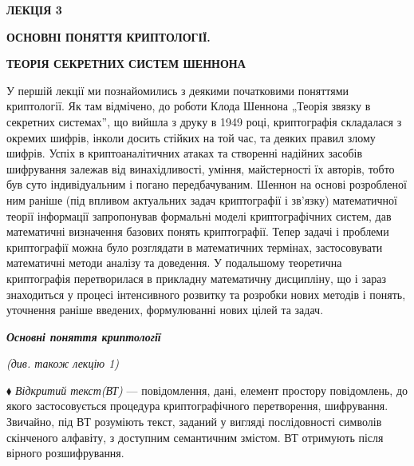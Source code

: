 \bigskip


\bigskip


\bigskip

{\bfseries
ЛЕКЦІЯ  3}


\bigskip

{\centering\bfseries
ОСНОВНІ ПОНЯТТЯ КРИПТОЛОГІЇ.
\par}

{\centering\bfseries
ТЕОРІЯ СЕКРЕТНИХ СИСТЕМ ШЕННОНА
\par}


\bigskip


\bigskip

У першій лекції ми познайомились з деякими початковими поняттями криптології. Як
там відмічено, до роботи Клода Шеннона „Теорія зв{\textquotesingle}язку в
секретних системах”, що вийшла з друку в 1949 році, криптографія складалася з 
окремих шифрів, інколи досить стійких на той час, та деяких правил злому
шифрів. Успіх в криптоаналітичних атаках та створенні надійних засобів
шифрування  залежав від винахідливості, уміння, майстерності їх авторів, тобто
був суто індивідуальним і погано передбачуваним. Шеннон на основі розробленої
ним раніше (під впливом актуальних задач криптографії і зв’язку) математичної
теорії інформації запропонував формальні моделі криптографічних систем, дав
математичні визначення базових понять криптографії. Тепер задачі і проблеми
криптографії можна було розглядати в математичних термінах, застосовувати
математичні методи аналізу та доведення. У подальшому теоретична криптографія 
перетворилася в прикладну математичну дисципліну, що і зараз знаходиться  у
процесі інтенсивного розвитку та розробки нових методів і понять, уточнення
раніше введених, формулюванні нових цілей та задач. 


\bigskip


\bigskip

{\centering\bfseries\itshape
Основні поняття криптології
\par}

{\centering\itshape
(див. також лекцію 1)
\par}


\bigskip


\bigskip

${\blacklozenge}$ \textit{Відкритий текст(ВТ)} --- повідомлення, дані, елемент
простору повідомлень, до якого застосовується процедура криптографічного
перетворення, шифрування. Звичайно, під ВТ розуміють текст, заданий у вигляді
послідовності символів скінченого алфавіту, з доступним семантичним змістом. ВТ
отримують після вірного розшифрування.

